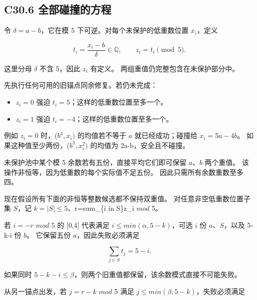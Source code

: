 \subsection*{\texorpdfstring{{C30.6} {全部碰撞的方程}}{C30.6 全部碰撞的方程}}\label{C30-h196}

{令} {\ensuremath{\delta =a-b}，它在模} {5} {下可逆。对每个未保护的低重数位置} {\ensuremath{x_{i}}，定义}

\[
t_i=\frac{x_i-b}{\delta}\in\mathbb Q,
\qquad z_i=t_i\pmod5.
\]

{这里分母} {\ensuremath{\delta }} {不含} {5，因此} {\ensuremath{z_{i}}} {有定义。} {两组重值仍完整包含在未保护部分中。}

{先执行任何可用的旧锚点同余修复。若仍未完成：}

\begin{itemize}
\tightlist
\item
  {\ensuremath{z_{i}=0}} {强迫} {\ensuremath{t_{i}=5}；这样的低重数位置至多一个。}
\item
  {\ensuremath{z_{i}=1}} {强迫} {\ensuremath{t_{i}=-4}；这样的低重数位置至多一个。}
\end{itemize}

{例如} {\ensuremath{z_{i}=0}} {时，(\ensuremath{b^{4},x_{i})}} {的均值若不等于} {\ensuremath{a}} {就已经成功；碰撞给} {\ensuremath{x_{i}=5a-4b}。} {如果这种值至少两份，(\ensuremath{b^{3},x_{i}^{2})}} {的均值为} {2a-b，安全且不碰撞。}

{未保护池中某个模} {5} {余数若有五份，直接平均它们即可保留} {\ensuremath{a}、\ensuremath{b}} {两个重值。} {该操作非恒等，因为低重数的每个实际值不足五份。} {因此只需所有余数重数至多四。}

{现在假设所有下面的非恒等整数候选都不保持双重值。} {对任意非空低重数位置子集} {\ensuremath{S}，记} {\ensuremath{k=|S|\le 5}、r=sum\_\{i} {in} {S\}z\_i} {\ensuremath{mod}} {5。}

{若} {\ensuremath{i=-r}} {\ensuremath{mod}} {5} {的} {{[}0,4{]}} {代表满足} {\ensuremath{i\le min(\alpha ,5-k)}，可选} {\ensuremath{i}} {份} {\ensuremath{a}、\ensuremath{S}，以及} {5-k-i} {份} {\ensuremath{b}。} {它保留五份} {\ensuremath{a}，因此失败必须满足}

\[
\sum_{j\in S}t_j=5-i.
\tag{C30.5}
\]

{如果同时} {\ensuremath{5-k-i\le \beta }，则两个旧重值都保留，该余数模式直接不可能失败。}

{从另一锚点出发，若} {\ensuremath{j=r-k}} {\ensuremath{mod}} {5} {满足} {\ensuremath{j\le min(\beta ,5-k)}，失败必须满足}

